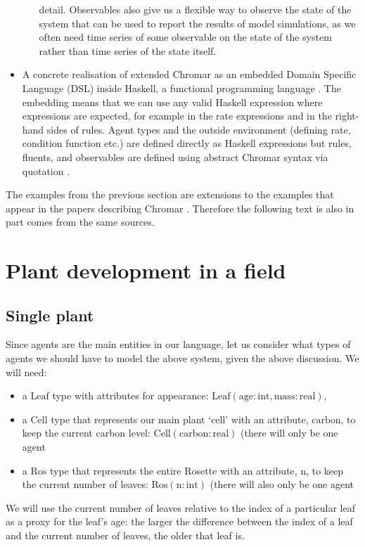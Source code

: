 \begin{itemize}
\begin{itemize}
    detail. Observables also give us a flexible way to observe the state of the
    system that can be used to report the results of model simulations, as we
    often need time series of some observable on the state of the system rather
    than time series of the state itself.
\end{itemize}
\item A concrete realisation of extended Chromar as an embedded Domain Specific
  Language (DSL) inside Haskell, a functional programming language
  \citep{gibbons_functional_2015}. The embedding means that we can use any valid
  Haskell expression where expressions are expected, for example in the rate
  expressions and in the right-hand sides of rules. Agent types and the outside
  environment (defining rate, condition function etc.) are defined directly as
  Haskell expressions but rules, fluents, and observables are defined using
  abstract Chromar syntax via quotation \citep{mainland_why_2007}.
\end{itemize}

The examples from the previous section are extensions to the examples that
appear in the papers describing Chromar \citep{honorato-zimmer_chromar_2017,
  honorato-zimmer_chromar_2018}. Therefore the following text is also in part
comes from the same sources.

\section{Plant development in a field}
\label{sec:plantDev}

\subsection{Single plant}
Since agents are the main entities in our language, let us
consider what types of agents we should have to model the above
system, given the above discussion. We will need:
\begin{itemize}
\item a $\mathrm{Leaf}$ type with attributes for 
appearance: $\mathrm{Leaf}(\mathrm{age}:\mathrm{int},
\mathrm{mass}:\mathrm{real})$,
\item a $\mathrm{Cell}$ type that represents our main plant `cell' with an
attribute, $\mathrm{carbon}$, to keep the current carbon level:
$\mathrm{Cell}(\mathrm{carbon}:\mathrm{real})$ (there will only be one agent
\item a $\mathrm{Ros}$ type that represents the entire Rosette with an
attribute, $\mathrm{n}$, to keep the current number of leaves:
$\mathrm{Ros}(\mathrm{n}:\mathrm{int})$ (there will also only be one agent
\end{itemize}
We will use the current number of leaves relative to the index of
a particular leaf as a proxy for the leaf's age: the larger the difference
between the index of a leaf and the current number of leaves, the older that
leaf is.

